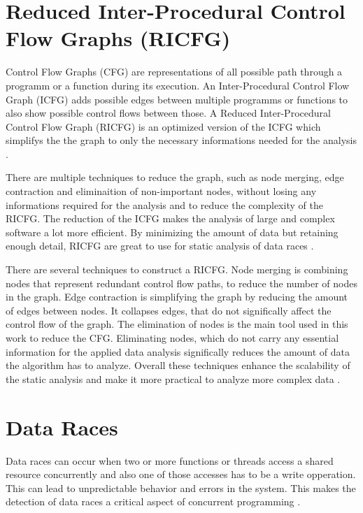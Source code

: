 \documentclass[
fancyheadings, %
%
%
]{stsreprt}
\begin{document}
{\section{Reduced Inter-Procedural Control Flow Graphs (RICFG)}
Control Flow Graphs (CFG) are representations of all possible path through a programm or a function during its execution. An Inter-Procedural Control Flow Graph (ICFG) adds possible edges between multiple programms or functions to also show possible control flows between those. A Reduced Inter-Procedural Control Flow Graph (RICFG) is an optimized version of the ICFG which simplifys the the graph to only the necessary informations needed for the analysis \cite{engler2003}.

There are multiple techniques to reduce the graph, such as node merging, edge contraction and eliminaition of non-important nodes, without losing any informations required for the analysis and to reduce the complexity of the RICFG. The reduction of the ICFG makes the analysis of large and complex software a lot more efficient. By minimizing the amount of data but retaining enough detail, RICFG are great to use for static analysis of data races \cite{wang2020}.

There are several techniques to construct a RICFG. Node merging is combining nodes that represent redundant control flow paths, to reduce the number of nodes in the graph. Edge contraction is simplifying the graph by reducing the amount of edges between nodes. It collapses edges, that do not significally affect the control flow of the graph. The elimination of nodes is the main tool used in this work to reduce the CFG. Eliminating nodes, which do not carry any essential information for the applied data analysis significally reduces the amount of data the algorithm has to analyze. Overall these techniques enhance the scalability of the static analysis and make it more practical to analyze more complex data \cite{muchnick1997}.


\section{Data Races}

Data races can occur when two or more functions or threads access a shared resource concurrently and also one of those accesses has to be a write opperation. This can lead to unpredictable behavior and errors in the system. This makes the detection of data races a critical aspect of concurrent programming \cite{flanagan2009}.

}
\end{document}
